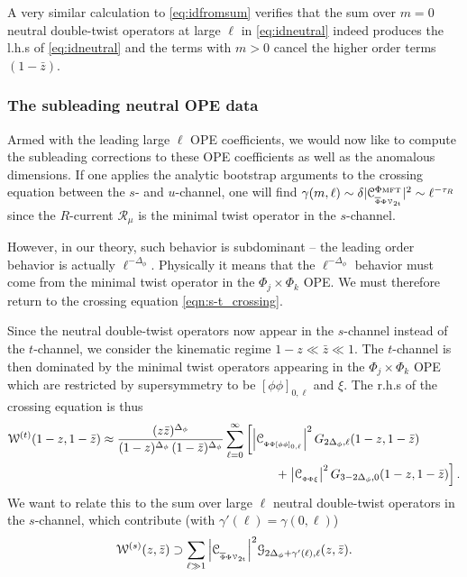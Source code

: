 \documentclass[11pt]{article}
\newcommand{\zb}{\bar{z}}
\newcommand{\Phib}{\overline{\Phi}}
\newcommand{\cope}[1]{\mathcal{C}_{_{#1}}}
\newcommand{\mft}{\text{\tiny MFT}}
\begin{document}
%
A very similar calculation to \eqref{eq:idfromsum} verifies that the sum over $m=0$ neutral double-twist operators at large $\ell$ in \eqref{eq:idneutral} indeed produces the l.h.s of \eqref{eq:idneutral} and the terms with $m>0$ cancel the higher order terms $(1-\zb)$.


\subsubsection{The subleading neutral OPE data}
\label{sec:nOPE2}

Armed with the leading large $\ell$ OPE coefficients, we would now like to compute the subleading corrections to these OPE coefficients as well as the anomalous dimensions. If one applies the analytic bootstrap arguments to the crossing equation between the $s$- and $u$-channel, one will find $\gamma(m,\ell) \sim \delta |\cope{\Phib\Phi\mathcal{V}_{\mathrm{2t}}}^{\Phi\mft}|^{2} \sim \ell^{-\tau_R}$ since the $R$-current $\mathcal{R}_{\mu}$ is the minimal twist operator in the $s$-channel. 

However, in our theory, such behavior is subdominant -- the leading order behavior is actually $\ell^{-\Delta_{\phi}}$. Physically it means that the $\ell^{-\Delta_{\phi}}$ behavior must come from the minimal twist operator in the $\Phi_j \times \Phi_k$ OPE. We must therefore return to the crossing equation \eqref{eqn:s-t_crossing}.

Since the neutral double-twist operators now appear in the $s$-channel instead of the $t$-channel, we consider the kinematic regime $1-z \ll \zb \ll 1$. The $t$-channel is then dominated by the minimal twist operators appearing in the $\Phi_j \times \Phi_k$ OPE which are restricted by supersymmetry to be $[\phi\phi]_{0,\ell}$ and $\xi$. The r.h.s of the crossing equation is thus
%
\begin{equation}\label{eq:tchannel_chiral}
\begin{split}
\mathcal{W}^{(t)}(1-z,1-\zb) 
&\approx 
  \frac{(z\zb)^{\Delta_{\phi}}}{(1-z)^{\Delta_\phi}\, (1-\zb)^{\Delta_{\phi}}}
    \sum_{\ell=0}^{\infty} \left[ \abs{\cope{\Phi\Phi[\phi\phi]_{0,\ell}}}^{2} \, G_{2\Delta_{\phi},\ell}(1-z,1-\zb)  \right. \\
& \left. \hspace{5cm}  
    +\;  \abs{\cope{\Phi\Phi\xi}}^{2} \, G_{3-2\Delta_{\phi},0}(1-z,1-\zb)\right]. 
\end{split}
\end{equation}
%
We want to relate this to the sum over large $\ell$ neutral double-twist operators in the $s$-channel, which contribute (with $\gamma'(\ell)= \gamma(0,\ell)$)
%
\begin{equation}\label{eq:schannel_dtwist}
\begin{split}
\mathcal{W}^{(s)}(z,\zb) \supset \sum_{\ell \gg 1} \abs{\cope{\Phib\Phi\mathcal{V}_{\mathrm{2t}}}}^{2}\mathcal{G}_{2\Delta_{\phi}+\gamma'(\ell),\ell}(z,\zb).
\end{split}
\end{equation}
%
\end{document}

